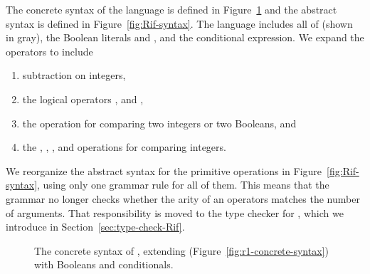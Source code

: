 \documentclass[11pt]{book}
\newcommand{\gray}[1]{{\color{gray} #1}}
\begin{document}
The concrete syntax of the \LangIf{} language is defined in
Figure~\ref{fig:Rif-concrete-syntax} and the abstract syntax is defined
in Figure~\ref{fig:Rif-syntax}. The \LangIf{} language includes all of
\LangVar{} (shown in gray), the Boolean literals  and
, and the conditional  expression. We expand the
operators to include
\begin{enumerate}
\item subtraction on integers,
\item the logical operators ,  and ,
\item the  operation for comparing two integers or two Booleans, and
\item the \key{<}, \key{<=}, \key{>}, and \key{>=} operations for
  comparing integers.
\end{enumerate}
We reorganize the abstract syntax for the primitive operations in
Figure~\ref{fig:Rif-syntax}, using only one grammar rule for all of
them. This means that the grammar no longer checks whether the arity
of an operators matches the number of arguments. That responsibility
is moved to the type checker for \LangIf{}, which we introduce in
Section~\ref{sec:type-check-Rif}.

\begin{figure}[tp]
\centering
\fbox{
\begin{minipage}{0.96\textwidth}
\[
\begin{array}{lcl}
  \itm{bool} &::=& \key{\#t} \mid \key{\#f} \\  
  \itm{cmp} &::= & \key{eq?} \mid \key{<} \mid \key{<=} \mid \key{>} \mid \key{>=} \\
  \Exp &::=& \gray{ \Int \mid \CREAD{} \mid \CNEG{\Exp} \mid \CADD{\Exp}{\Exp} }  \mid \CSUB{\Exp}{\Exp} \\
     &\mid&  \gray{ \Var \mid \CLET{\Var}{\Exp}{\Exp} } \\
     &\mid& \itm{bool}
      \mid (\key{and}\;\Exp\;\Exp) \mid (\key{or}\;\Exp\;\Exp)
      \mid (\key{not}\;\Exp) \\
      &\mid& (\itm{cmp}\;\Exp\;\Exp) \mid \CIF{\Exp}{\Exp}{\Exp} \\
  \LangIf{} &::=& \Exp
\end{array}
\]
\end{minipage}
}
\caption{The concrete syntax of \LangIf{}, extending \LangVar{}
  (Figure~\ref{fig:r1-concrete-syntax}) with Booleans and conditionals.}
\label{fig:Rif-concrete-syntax}
\end{figure}
\end{document}
